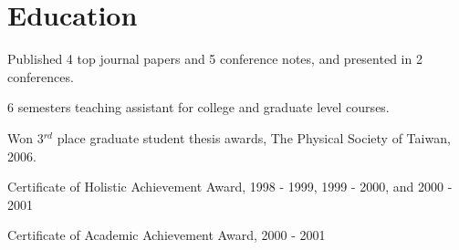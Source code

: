 \documentclass[letterpaper]{deedy-resume-openfont}
\begin{document}


\section{Education} 

\begin{tightemize}
\item Published 4 top journal papers and 5 conference notes, and presented in 2 conferences.
\item 6 semesters teaching assistant for college and graduate level courses.
\end{tightemize}
\sectionsep

\begin{tightemize}
\item Won 3$^{rd}$ place graduate student thesis awards, The Physical Society of Taiwan, 2006.
\end{tightemize}
\sectionsep

\begin{tightemize}
\item Certificate of Holistic Achievement Award, 1998 - 1999, 1999 - 2000, and 2000 - 2001
\item Certificate of Academic Achievement Award, 2000 - 2001
\end{tightemize}
\sectionsep
\end{document}
